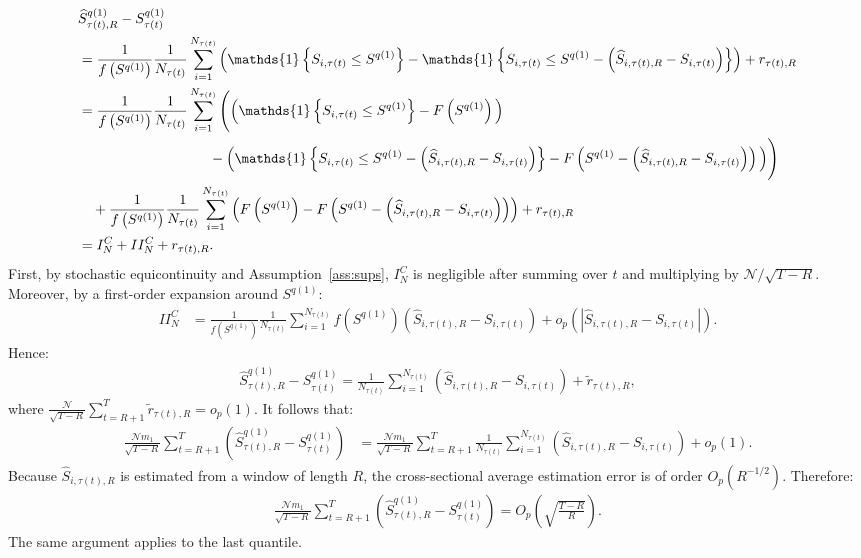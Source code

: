 \begin{align*}
&\widehat{S}_{\tau(t),R}^{q(1)}-S_{\tau(t)}^{q(1)} \\
&=\frac{1}{f\left( S^{q(1)}\right)}\frac{1}{N_{\tau(t)}}\sum_{i=1}^{N_{\tau(t)}}\left( \mathds{1}\left\{ S_{i,\tau(t)}\leq S^{q(1)}\right\}-\mathds{1}\left\{ S_{i,\tau(t)}\leq S^{q(1)}-\left( \widehat{S}_{i,\tau(t),R}-S_{i,\tau(t)}\right)\right\} \right)
+r_{\tau(t),R} \\
&=\frac{1}{f\left( S^{q(1)}\right)}\frac{1}{N_{\tau(t)}}\sum_{i=1}^{N_{\tau(t)}}\Bigg( \Big( \mathds{1}\left\{ S_{i,\tau(t)}\leq S^{q(1)}\right\}-F\left( S^{q(1)}\right) \Big) \\
&\hspace{3.3cm} -\Big( \mathds{1}\left\{ S_{i,\tau(t)}\leq S^{q(1)}-\left( \widehat{S}_{i,\tau(t),R}-S_{i,\tau(t)}\right)\right\}
-F\left( S^{q(1)}-\left( \widehat{S}_{i,\tau(t),R}-S_{i,\tau(t)}\right) \right) \Big) \Bigg) \\
&\quad +\frac{1}{f\left( S^{q(1)}\right)}\frac{1}{N_{\tau(t)}}\sum_{i=1}^{N_{\tau(t)}}\left( F\left( S^{q(1)}\right)-F\left( S^{q(1)}-\left( \widehat{S}_{i,\tau(t),R}-S_{i,\tau(t)}\right) \right) \right)
+r_{\tau(t),R} \\
&= I_N^C + II_N^C +r_{\tau(t),R}.
\end{align*}
First, by stochastic equicontinuity and Assumption~\ref{ass:sups}, $I_N^C$ is negligible after summing over $t$ and multiplying by $\mathcal{N}/\sqrt{T-R}$. Moreover, by a first-order expansion around $S^{q(1)}$:
\begin{align*}
II_N^C &= \frac{1}{f\left( S^{q(1)}\right)}\frac{1}{N_{\tau(t)}}\sum_{i=1}^{N_{\tau(t)}} f\left( S^{q(1)}\right)\left( \widehat{S}_{i,\tau(t),R}-S_{i,\tau(t)}\right)
+o_p\left( \left|\widehat{S}_{i,\tau(t),R}-S_{i,\tau(t)}\right| \right).
\end{align*}
Hence:
\begin{align*}
\widehat{S}_{\tau(t),R}^{q(1)}-S_{\tau(t)}^{q(1)}
=\frac{1}{N_{\tau(t)}}\sum_{i=1}^{N_{\tau(t)}}\left( \widehat{S}_{i,\tau(t),R}-S_{i,\tau(t)}\right)+\widetilde{r}_{\tau(t),R},
\end{align*}
where $\frac{\mathcal{N}}{\sqrt{T-R}}\sum_{t=R+1}^{T}\widetilde{r}_{\tau(t),R}=o_p(1)$. It follows that:
\begin{align*}
\frac{\mathcal{N}m_{1}}{\sqrt{T-R}}\sum_{t=R+1}^{T}\left( \widehat{S}_{\tau(t),R}^{q(1)}-S_{\tau(t)}^{q(1)}\right)
&=\frac{\mathcal{N}m_{1}}{\sqrt{T-R}}\sum_{t=R+1}^{T}\frac{1}{N_{\tau(t)}}\sum_{i=1}^{N_{\tau(t)}}\left( \widehat{S}_{i,\tau(t),R}-S_{i,\tau(t)}\right)+o_p(1).
\end{align*}
Because $\widehat{S}_{i,\tau(t),R}$ is estimated from a window of length $R$, the cross-sectional average estimation error is of order $O_p(R^{-1/2})$. Therefore:
\begin{align*}
\frac{\mathcal{N}m_{1}}{\sqrt{T-R}}\sum_{t=R+1}^{T}\left( \widehat{S}_{\tau(t),R}^{q(1)}-S_{\tau(t)}^{q(1)}\right)
=O_p\left( \sqrt{\frac{T-R}{R}}\right).
\end{align*}
The same argument applies to the last quantile.

